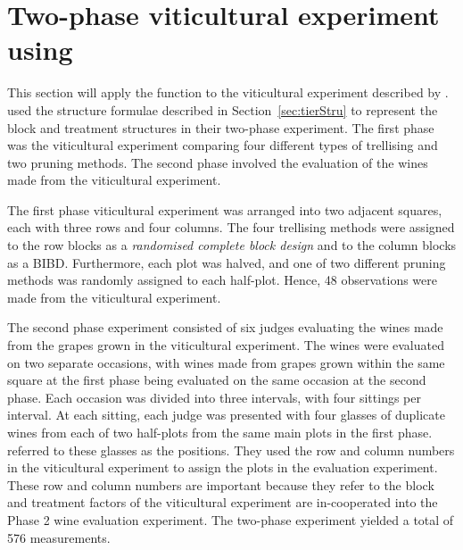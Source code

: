 \documentclass[article]{jss}
\begin{document}
\section[Example]{Two-phase viticultural experiment using }\label{sec:example}
This section will apply the function  to the viticultural experiment described by \cite{Brien1999}. \cite{Brien1999} used the structure formulae described in Section~\ref{sec:tierStru} to represent the block and treatment structures in their two-phase experiment. The first phase was the viticultural experiment comparing four different types of trellising and two pruning methods. The second phase involved the evaluation of the wines made from the viticultural experiment.

The first phase viticultural experiment was arranged into two adjacent squares, each with three rows and four columns. The four trellising methods were assigned to the row blocks as a \emph{randomised complete block design} and to the column blocks as a BIBD. Furthermore, each plot was halved, and one of two different pruning methods was randomly assigned to each half-plot. Hence, 48 observations were made from the viticultural experiment.

The second phase experiment consisted of six judges evaluating the wines made from the grapes grown in the viticultural experiment. The wines were evaluated on two separate occasions, with wines made from grapes grown within the same square at the first phase being evaluated on the same occasion at the second phase. Each occasion was divided into three intervals, with four sittings per interval. At each sitting, each judge was presented with four glasses of duplicate wines from each of two half-plots from the same main plots in the first phase. \cite{Brien1999} referred to these glasses as the positions. They used the row and column numbers in the viticultural experiment to assign the plots in the evaluation experiment. These row and column numbers are important because they refer to the block and treatment factors of the viticultural experiment are in-cooperated into the Phase 2 wine evaluation experiment. The two-phase experiment yielded a total of 576 measurements.
\end{document}
